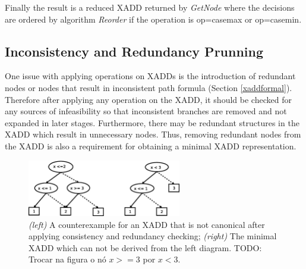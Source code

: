 \documentclass[twoside,11pt]{article}
\begin{document}
Finally the result is a reduced XADD returned by \emph{GetNode} where the decisions are ordered by algorithm \emph{Reorder} if the operation is op=casemax or op=casemin. 

\subsection{Inconsistency and Redundancy Prunning}


One issue with applying operations on XADDs is the introduction of redundant nodes or nodes that result in inconsistent path formula (Section \ref{xaddformal}). Therefore after applying any operation on the XADD, it should be checked for any sources of infeasibility so that inconsistent branches are removed and not expanded in later stages. Furthermore, there may be redundant structures in the XADD which result in unnecessary nodes.
Thus, removing redundant nodes from the XADD is also a requirement for obtaining a minimal XADD representation. 






\begin{figure}[t!]
\centering
\includegraphics[width=0.6\textwidth]{FiguresSource/counterExample.eps} 
\caption{%
{\it (left)} A counterexample for an XADD that is not canonical after applying consistency and redundancy checking; {\it (right)}  The minimal XADD which can not be derived from the left diagram.  \color{red}  TODO: Trocar na figura o nó $x>=3$ por $x<3$. } %
\label{fig:canonical}
\end{figure}
\end{document}
